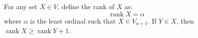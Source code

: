 For any set $X \in V$, define the rank of $X$ as:
$$\operatorname{rank} X = \alpha$$
where $\alpha$ is the least ordinal such that $X \in V_{\alpha+1}$. If $Y \in X$, then $\operatorname{rank} X \geqslant \operatorname{rank} Y + 1$.
